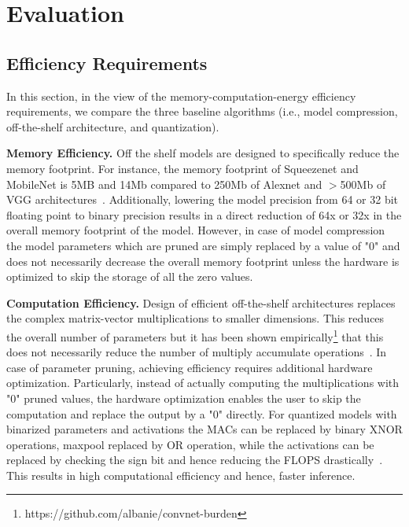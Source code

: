\section{Evaluation}

\subsection{Efficiency Requirements}\label{eval-efficiency}

In this section, in the view of the memory-computation-energy efficiency requirements, we compare the three baseline algorithms (i.e., model compression, off-the-shelf architecture, and quantization).


\noindent\textbf{Memory Efficiency.} Off the shelf models are designed to specifically reduce the memory footprint.
For instance, the memory footprint of Squeezenet and MobileNet is 5MB and 14Mb compared to 250Mb of Alexnet and $>$500Mb of VGG architectures~\cite{DBLP:journals/corr/IandolaMAHDK16,conf/cvpr/SandlerHZZC18}.
Additionally, lowering the model precision from 64 or 32 bit floating point to binary precision results in a direct reduction of 64x or 32x in the overall memory footprint of the model.
However, in case of model compression the model parameters which are pruned are simply replaced by a value of "0"  and does not necessarily decrease the overall memory footprint unless the hardware is optimized to skip the storage of all the zero values.


\noindent\textbf{Computation Efficiency.} Design of efficient off-the-shelf architectures replaces the complex matrix-vector multiplications to smaller dimensions.
This reduces the overall number of parameters but it has been shown empirically\footnote{https://github.com/albanie/convnet-burden} that this does not necessarily reduce the number of multiply accumulate operations~\cite{article}.
In case of parameter pruning, achieving efficiency requires additional hardware optimization. Particularly, instead of actually computing the multiplications with "0" pruned values, the hardware optimization enables the user to skip the computation and replace the output by a "0" directly.
For quantized models with binarized parameters and activations the MACs can be replaced by binary XNOR operations, maxpool replaced by OR operation, while the activations can be replaced by checking the sign bit and hence reducing the FLOPS drastically~\cite{235489}.
This results in high computational efficiency and hence, faster inference.



